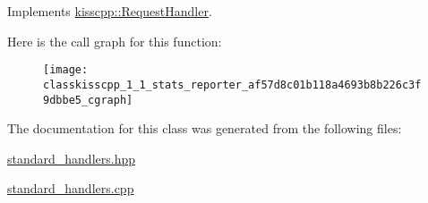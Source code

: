 Implements \hyperlink{classkisscpp_1_1_request_handler_a3606f772c07297826847a8e36226cdaa}{kisscpp\-::\-Request\-Handler}.



Here is the call graph for this function\-:
\nopagebreak
\begin{figure}[H]
\begin{center}
\leavevmode
\texttt{[image: classkisscpp\_1\_1\_stats\_reporter\_af57d8c01b118a4693b8b226c3f9dbbe5\_cgraph]}
\end{center}
\end{figure}




The documentation for this class was generated from the following files\-:\begin{DoxyCompactItemize}
\item 
\hyperlink{standard__handlers_8hpp}{standard\-\_\-handlers.\-hpp}\item 
\hyperlink{standard__handlers_8cpp}{standard\-\_\-handlers.\-cpp}\end{DoxyCompactItemize}
